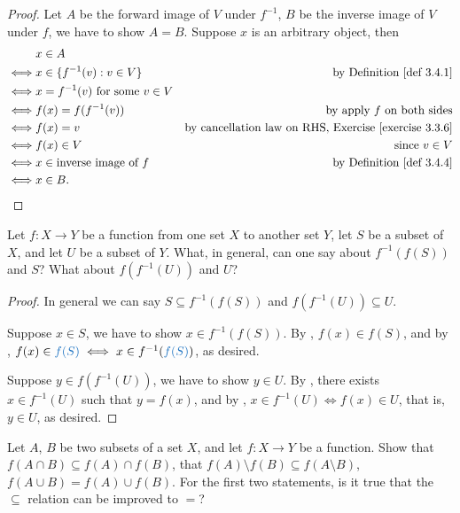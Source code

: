 \begin{proof}
Let \(A\) be the forward image of \(V\) under \(f^{-1}\), \(B\) be the inverse image of \(V\) under \(f\), we have to show \(A = B\).
Suppose \(x\) is an arbitrary object, then
\begin{align*}
         & x \in A \\
    \iff & x \in \{ f^{-1}(v) : v \in V \} & \text{by \DEF{3.4.1}} \\
    \iff & x = f^{-1}(v) \text{\ for some\ } v \in V \\
    \iff & f(x) = f(f^{-1}(v)) & \text{by apply \(f\) on both sides} \\
    \iff & f(x) = v & \text{by cancellation law on RHS, \EXEC{3.3.6}} \\
    \iff & f(x) \in V & \text{since \(v \in V\)} \\
    \iff & x \in \text{inverse image of \(f\)} & \text{by \DEF{3.4.4}} \\
    \iff & x \in B.
\end{align*}
\end{proof}

\begin{exercise} \label{exercise 3.4.2}
Let \(f : X \to Y\) be a function from one set \(X\) to another set \(Y\), let \(S\) be a subset of \(X\), and let \(U\) be a subset of \(Y\).
What, in general, can one say about \(f^{-1}(f(S))\) and \(S\)?
What about \(f(f^{-1}(U))\) and \(U\)?
\end{exercise}

\begin{proof}
In general we can say \(S \subseteq f^{-1}(f(S))\) and \(f(f^{-1}(U)) \subseteq U\).

Suppose \(x \in S\), we have to show \(x \in f^{-1}(f(S))\).
By , \(f(x) \in f(S)\), and by , \(f(x) \in \BLUE{f(S)} \iff x \in f^{-1}( \BLUE{f(S)} )\), as desired.

Suppose \(y \in f(f^{-1}(U))\), we have to show \(y \in U\).
By , there exists \(x \in f^{-1}(U)\) such that \(y = f(x)\), and by , \(x \in f^{-1}(U) \iff f(x) \in U\), that is, \(y \in U\), as desired.
\end{proof}

\begin{exercise} \label{exercise 3.4.3}
Let \(A\), \(B\) be two subsets of a set \(X\), and let \(f : X \to Y\) be a function.
Show that \(f(A \cap B) \subseteq f(A) \cap f(B)\), that \(f(A) \setminus f(B) \subseteq f(A \setminus B)\), \(f(A \cup B) = f(A) \cup f(B)\).
For the first two statements, is it true that the \(\subseteq\) relation can be improved to \(=\)?
\end{exercise}

